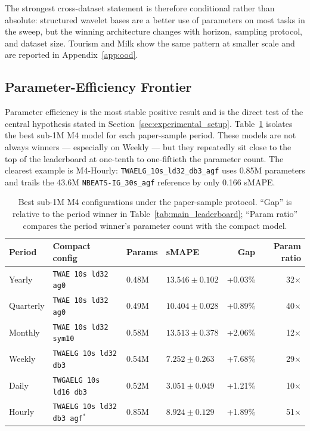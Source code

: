 \documentclass[11pt,a4paper]{article}
\begin{document}
The strongest cross-dataset statement is therefore conditional rather than absolute: structured wavelet bases are a better use of parameters on most tasks in the sweep, but the winning architecture changes with horizon, sampling protocol, and dataset size. Tourism and Milk show the same pattern at smaller scale and are reported in Appendix~\ref{app:ood}.

\subsection{Parameter-Efficiency Frontier}
\label{sec:param_efficiency}

Parameter efficiency is the most stable positive result and is the direct test of the central hypothesis stated in Section~\ref{sec:experimental_setup}. Table~\ref{tab:sub1m_frontier} isolates the best sub-1M M4 model for each paper-sample period. These models are not always winners --- especially on Weekly --- but they repeatedly sit close to the top of the leaderboard at one-tenth to one-fiftieth the parameter count. The clearest example is M4-Hourly: \texttt{TWAELG\_10s\_ld32\_db3\_agf} uses 0.85M parameters and trails the 43.6M \texttt{NBEATS-IG\_30s\_agf} reference by only 0.166 sMAPE.

\begin{table}[t]
  \caption{Best sub-1M M4 configurations under the paper-sample protocol. ``Gap'' is relative to the period winner in Table~\ref{tab:main_leaderboard}; ``Param ratio'' compares the period winner's parameter count with the compact model.}
  \label{tab:sub1m_frontier}
  \centering
  \scriptsize
  \setlength{\tabcolsep}{3pt}
  \begin{tabular}{llllrr}
    \toprule
    Period & Compact config & Params & sMAPE & Gap & Param ratio \\
    \midrule
    Yearly    & \texttt{TWAE 10s ld32 ag0}        & 0.48M & $13.546 \pm 0.102$ & +0.03\% & 32$\times$ \\
    Quarterly & \texttt{TWAE 10s ld32 ag0}        & 0.49M & $10.404 \pm 0.028$ & +0.89\% & 40$\times$ \\
    Monthly   & \texttt{TWAE 10s ld32 sym10}      & 0.58M & $13.513 \pm 0.378$ & +2.06\% & 12$\times$ \\
    Weekly    & \texttt{TWAELG 10s ld32 db3}      & 0.54M & $7.252 \pm 0.263$  & +7.68\% & 29$\times$ \\
    Daily     & \texttt{TWGAELG 10s ld16 db3}     & 0.52M & $3.051 \pm 0.049$  & +1.21\% & 10$\times$ \\
    Hourly    & \texttt{TWAELG 10s ld32 db3 agf}$^*$ & 0.85M & $8.924 \pm 0.129$ & +1.89\% & 51$\times$ \\
    \bottomrule
  \end{tabular}
\end{table}
\end{document}
